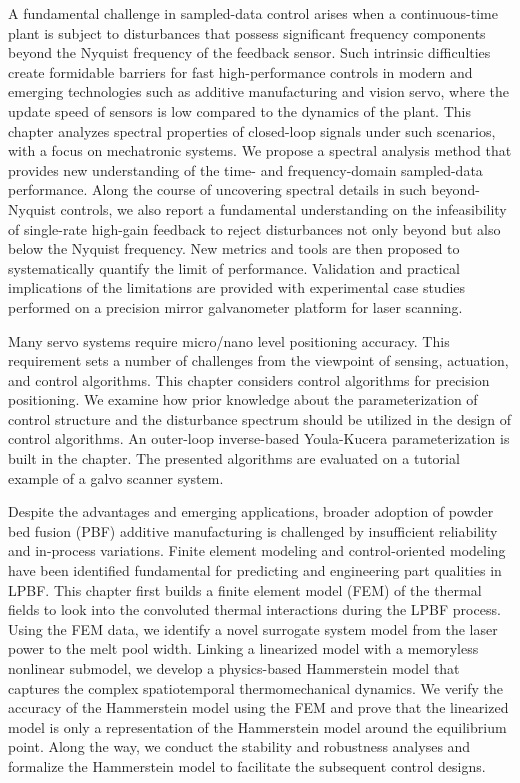 \documentclass [11pt, proquest] {uwthesis}[2020/02/24]
\begin{document}
A fundamental challenge in sampled-data control arises when a continuous-time plant is subject to disturbances that possess significant frequency components beyond the Nyquist frequency of the feedback sensor. Such intrinsic difficulties create formidable barriers for fast high-performance controls in modern and emerging technologies such as additive manufacturing and vision servo, where the update speed of sensors is low compared to the dynamics of the plant. This chapter analyzes spectral properties of closed-loop signals under such scenarios, with a focus on mechatronic systems. We propose a spectral analysis method that provides new understanding of the time- and frequency-domain sampled-data performance. Along the course of uncovering spectral details in such beyond-Nyquist controls, we also report a fundamental understanding on the infeasibility of single-rate high-gain feedback to reject disturbances not only beyond but also below the Nyquist frequency. New metrics and tools are then proposed to systematically quantify the limit of performance. Validation and practical implications of the limitations are provided with experimental case studies performed on a precision mirror galvanometer platform for laser scanning.

Many servo systems require micro/nano level positioning accuracy. This requirement sets a number of challenges from the viewpoint of sensing, actuation, and control algorithms. This chapter considers control algorithms for precision positioning. We examine how prior knowledge about the parameterization of control structure and the disturbance spectrum should be utilized in the design of control algorithms. An outer-loop inverse-based Youla-Kucera parameterization is built in the chapter. The presented algorithms are evaluated on a tutorial example of a galvo scanner system.

Despite the advantages and emerging applications, broader adoption
of powder bed fusion (PBF) additive manufacturing is challenged by
insufficient reliability and in-process variations. Finite element
modeling and control-oriented modeling have been identified fundamental
for predicting and engineering part qualities in LPBF. This chapter first
builds a finite element model (FEM) of the thermal fields to look
into the convoluted thermal interactions during the LPBF process. Using
the FEM data, we identify a novel surrogate system model from the
laser power to the melt pool width. Linking a linearized model with
a memoryless nonlinear submodel, we develop a physics-based Hammerstein
model that captures the complex spatiotemporal thermomechanical dynamics.
We verify the accuracy of the Hammerstein model using the FEM and
prove that the linearized model is only a representation of the Hammerstein
model around the equilibrium point. Along the way, we conduct the
stability and robustness analyses and formalize the Hammerstein model
to facilitate the subsequent control designs.
\end{document}
